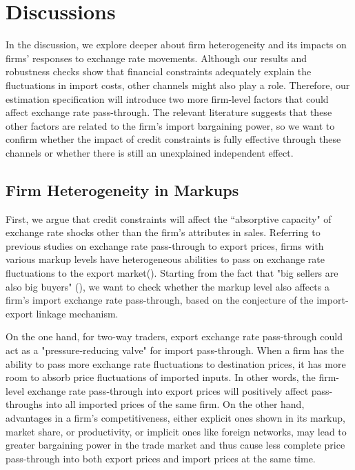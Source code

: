 \documentclass[12pt]{article}
\begin{document}
\section{Discussions} \label{Discussion}

In the discussion, we explore deeper about firm heterogeneity and its impacts on firms’ responses to exchange rate movements. Although our results and robustness checks show that financial constraints adequately explain the fluctuations in import costs, other channels might also play a role. Therefore, our estimation specification will introduce two more firm-level factors that could affect exchange rate pass-through. The relevant literature suggests that these other factors are related to the firm's import bargaining power, so we want to confirm whether the impact of credit constraints is fully effective through these channels or whether there is still an unexplained independent effect.

\subsection{Firm Heterogeneity in Markups}

First, we argue that credit constraints will affect the ``absorptive capacity" of exchange rate shocks other than the firm's attributes in sales. Referring to previous studies on exchange rate pass-through to export prices, firms with various markup levels have heterogeneous abilities to pass on exchange rate fluctuations to the export market(\cite{aik2019}). Starting from the fact that "big sellers are also big buyers" (\cite{aik2014}), we want to check whether the markup level also affects a firm's import exchange rate pass-through, based on the conjecture of the import-export linkage mechanism.

On the one hand, for two-way traders, export exchange rate pass-through could act as a "pressure-reducing valve" for import pass-through. When a firm has the ability to pass more exchange rate fluctuations to destination prices, it has more room to absorb price fluctuations of imported inputs. In other words, the firm-level exchange rate pass-through into export prices will positively affect pass-throughs into all imported prices of the same firm. On the other hand, advantages in a firm's competitiveness, either explicit ones shown in its markup, market share, or productivity, or implicit ones like foreign networks, may lead to greater bargaining power in the trade market and thus cause less complete price pass-through into both export prices and import prices at the same time.
\end{document}
